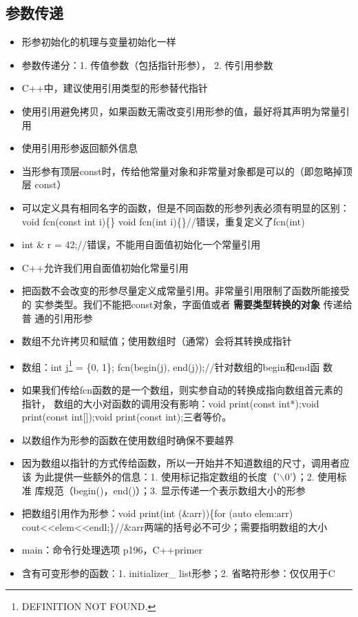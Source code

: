 \documentclass[11pt]{article}
\begin{document}
\subsection{参数传递}
\label{sec-4-1}
\begin{itemize}
\item 形参初始化的机理与变量初始化一样
\item 参数传递分：1. 传值参数（包括指针形参）， 2. 传引用参数
\item C++中，建议使用引用类型的形参替代指针
\item 使用引用避免拷贝，如果函数无需改变引用形参的值，最好将其声明为常量引用
\item 使用引用形参返回额外信息
\item 当形参有顶层const时，传给他常量对象和非常量对象都是可以的（即忽略掉顶层
const）
\item 可以定义具有相同名字的函数，但是不同函数的形参列表必须有明显的区别：
void fcn(const int i)\{\} void fcn(int i)\{\}//错误，重复定义了fcn(int)
\item int \& r = 42;//错误，不能用自面值初始化一个常量引用
\item C++允许我们用自面值初始化常量引用
\item 把函数不会改变的形参尽量定义成常量引用。非常量引用限制了函数所能接受的
实参类型。我们不能把const对象，字面值或者 \textbf{需要类型转换的对象} 传递给普
通的引用形参
\item 数组不允许拷贝和赋值；使用数组时（通常）会将其转换成指针
\item 数组：int j\footnote{DEFINITION NOT FOUND.} = \{0, 1\}; fcn(begin(j), end(j));//针对数组的begin和end函
数
\item 如果我们传给fcn函数的是一个数组，则实参自动的转换成指向数组首元素的指针，
数组的大小对函数的调用没有影响：void print(const int*);void
print(const int[]);void print(const int\footnotemark[1]{});三者等价。
\item 以数组作为形参的函数在使用数组时确保不要越界
\item 因为数组以指针的方式传给函数，所以一开始并不知道数组的尺寸，调用者应该
为此提供一些额外的信息：1. 使用标记指定数组的长度（'$\backslash$0'）；2. 使用标准
库规范（begin()，end()）；3. 显示传递一个表示数组大小的形参
\item 把数组引用作为形参：void print(int (\&arr)\footnotemark[1]{})\{for (auto elem:arr)
cout<<elem<<endl;\}//\&arr两端的括号必不可少；需要指明数组的大小
\item main：命令行处理选项 p196，C++primer
\item 含有可变形参的函数：1. initializer\_ list形参；2. 省略符形参：仅仅用于C

\end{itemize}
\end{document}
